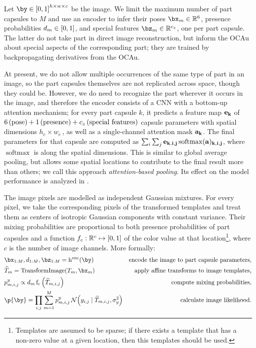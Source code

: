 Let $\by \in \interval{0, 1}^{h \times w \times c}$ be the image.
We limit the maximum number of part capsules to $M$ and use an encoder to infer their poses $\bx_m \in \RR^6$, presence probabilities $d_m \in {\left[0, 1\right]}$, and special features $\bz_m \in \RR^{c_z}$, one per part capsule.
The latter do not take part in direct image reconstruction, but inform the \gls{OCAu} about special aspects of the corresponding part; they are trained by backpropagating derivatives from the \gls{OCAu}.

At present, we do not allow multiple occurrences of the same type of part in an image, so the part capsules themselves are not replicated across space, though they could be.
However, we do need to recognize the part wherever it occurs in the image, and therefore the encoder consists of a \gls{CNN} with a bottom-up attention mechanism; for every part capsule $k$, it predicts a feature map $\bf{e}_k$ of $6 \text{\,(pose)} + 1 \text{\,(presence)} + c_z \text{\,(special features)}$ capsule parameters with spatial dimensions $h_e \times w_e$\,, as well as a single-channel attention mask $\bf{a}_k$.
The final parameters for that capsule are computed as $\sum_{i} \sum_j \bf{e}_{k, i,j} \operatorname{softmax}(\bf{a})_{k,i,j}$, where $\operatorname{softmax}$ is along the spatial dimensions.
This is similar to global average pooling, but allows some spatial locations to contribute to the final result more than others; we call this approach \textit{attention-based pooling}. Its effect on the model performance is analyzed in .

The image pixels are modelled as independent Gaussian mixtures.
For every pixel, we take the corresponding pixels of the transformed templates and treat them as centers of isotropic Gaussian components with constant variance.
Their mixing probabilities are proportional to both presence probabilities of part capsules and a function $f_c: \mathbb{R}^c \mapsto {\left[0, 1\right]}$ of the color value at that location\footnote{
Templates are assumed to be sparse; if there exists a template that has a non-zero value at a given location, then this templates should be used.}, where $c$ is the number of image channels. 
More formally:
\vspace*{-.3em}
\begin{align}
    &\bx_{1:M}, d_{1:M}, \bz_{1:M} = \operatorname{h^{\mathrm{enc}}}(\by) &\text{encode the image to part capsule parameters,}\\
    &\widehat{T}_m = \operatorname{TransformImage} (T_m, \bx_m)  &\text{apply affine transforms to image templates,}\\
    &p^y_{m,i,j} \propto d_m \operatorname{f_c}\left(\widehat{T}_{m,i,j}\right) &\text{compute mixing probabilities,}\\
    &\p{\by} = \prod_{i,j} \sum_{m=1}^M p^y_{m,i,j}\, \gauss{y_{i,j} \mid \widehat{T}_{m,i,j}, \sigma^2_y} &\text{calculate image likelihood.} \label{eq:im_likelihood}
\end{align}

